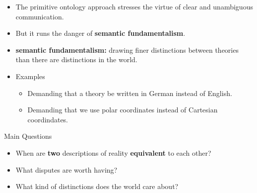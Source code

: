 \documentclass[17pt]{beamer}
\begin{document}
\begin{frame}

  \begin{itemize}
  \item The primitive ontology approach stresses the virtue of clear
    and unambiguous communication.
  \item But it runs the danger of \textbf{semantic fundamentalism}.
  \end{itemize}





\end{frame}

\begin{frame}

  \begin{itemize} \item \textbf{semantic fundamentalism:} drawing
    finer distinctions between theories than there are distinctions in
    the world.
  \item Examples
    \begin{itemize}
    \item Demanding that a theory be written in German instead of English.
    \item Demanding that we use polar coordinates instead of Cartesian
      coordindates.  
     \end{itemize}  \end{itemize}

\end{frame}



\begin{frame}{Main Questions}

  \begin{itemize}
    \item When are \textbf{two} descriptions of reality \textbf{equivalent} to
      each other?
    \item What disputes are worth having?
    \item What kind of distinctions does the world care about?    
  \end{itemize}

\end{frame}
\end{document}
